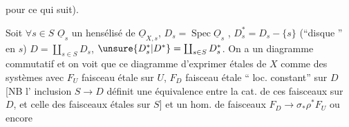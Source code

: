 

pour ce qui suit). 

Soit $\forall s\in S$ $\underline{O}_s$ un hensélisé de $\underline{O}_{X,s}$,
$D_s=\operatorname{Spec}\underline{O}_s$ , $D_s^{*}=D_s-\{s\}$  (``disque '' en
$s$) $D=\coprod_{s\in S}D_s$, $\unsure{D_s^{*}|D^{*}}=\coprod_{s\in S}D_s^{*}$. On a
un diagramme commutatif
et on voit  que ce diagramme   d'exprimer
  étales de $X$ 
comme des systèmes  
avec $F_U$ faisceau étale sur $U$, $F_D$ faisceau
étale `` loc. constant'' sur $D$ [NB l'
inclusion $S\to D$ définit une équivalence
entre la cat. de ces faisceaux sur $D$, et
celle des faisceaux étales sur $S$] et
un hom. de faisceaux $F_D\to\sigma_{*}\rho^{*}F_U$ ou encore

